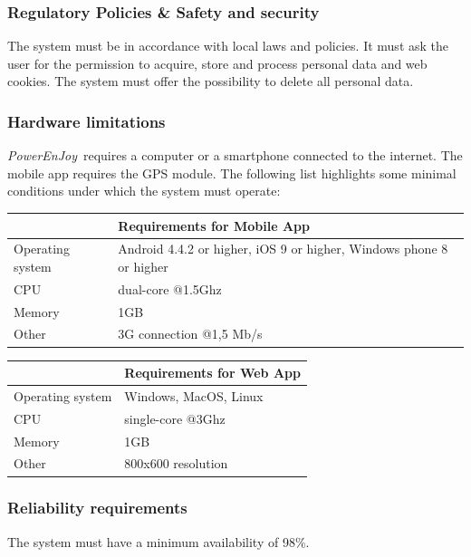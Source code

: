 \documentclass{article}
\newcommand{\pej}{\mbox{\normalfont\itshape PowerEnJoy }}
\begin{document}
		\subsubsection{Regulatory Policies \& Safety and security}
		The system must be in accordance with local laws and policies. It must ask the user for the permission to acquire, store and process personal data and web cookies. The system must offer the possibility to delete all personal data.
		\subsubsection{Hardware limitations}
		\pej requires a computer or a smartphone connected to the internet. The mobile app requires the GPS module. The following list highlights some minimal conditions under which the system must operate: \\
		
			\begin{center}
				\begin{tabular}{ | l | p{5cm} |}
					\hline
					& Requirements for Mobile App\\ \hline
					Operating system & Android 4.4.2 or higher, iOS 9 or higher, Windows phone 8 or higher\\\hline
					CPU & dual-core @1.5Ghz\\\hline
					Memory & 1GB \\\hline
					Other & 3G connection @1,5 Mb/s \\\hline
				\end{tabular}
			\end{center}
			
			\begin{center}
				\begin{tabular}{ | l | p{5cm} |}
					\hline
					& Requirements for Web App\\ \hline
					Operating system & Windows, MacOS, Linux\\\hline
					CPU & single-core @3Ghz \\\hline
					Memory & 1GB \\\hline
					Other & 800x600 resolution \\\hline
				\end{tabular}
			\end{center}
		\subsubsection{Reliability requirements}
		The system must have a minimum availability of 98\%.
\end{document}
